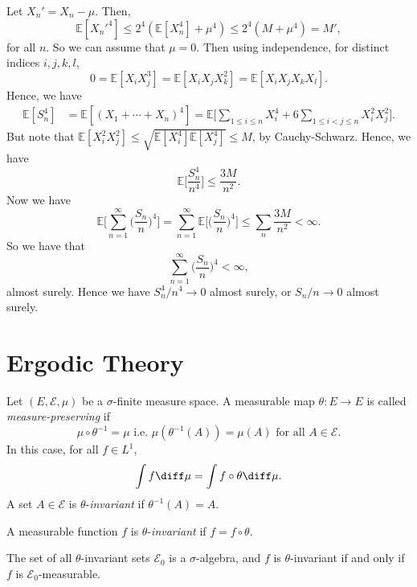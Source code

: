 \documentclass[12pt]{article}
\begin{document}
\begin{proofbox}
	Let $X_n' = X_n - \mu$. Then,
	\[
	\mathbb{E}[X_n'^4] \leq 2^4( \mathbb{E}[X_n^4] + \mu^4) \leq 2^4(M + \mu^4) = M',
	\]
	for all $n$. So we can assume that $\mu = 0$. Then using independence, for distinct indices $i, j, k, l$,
	\[
	0 = \mathbb{E}[X_i X_j^3] = \mathbb{E}[X_i X_j X_k^2] = \mathbb{E}[X_i X_j X_k X_l].
	\]
	Hence, we have
	\begin{align*}
		\mathbb{E}[S_n^4] &= \mathbb{E}[(X_1 + \cdots + X_n)^4] = \mathbb{E}\biggl[ \sum_{1 \leq i \leq n} X_i^4 + 6 \sum_{1 \leq i < j \leq n} X_i^2 X_j^2 \biggr].
	\end{align*}
	But note that $\mathbb{E}[X_i^2 X_j^2] \leq \sqrt{\mathbb{E}[X_i^4] \mathbb{E}[X_j^4]} \leq M$, by Cauchy-Schwarz. Hence, we have
	\[
	\mathbb{E}\biggl[ \frac{S_n^4}{n^4}\biggr] \leq \frac{3M}{n^2}.
	\]
	Now we have
	\[
	\mathbb{E}\biggl[ \sum_{n = 1}^{\infty} \biggl( \frac{S_n}{n} \biggr)^4 \biggr] = \sum_{n = 1}^{\infty} \mathbb{E}\biggl[ \biggl( \frac{S_n}{n} \biggr)^{4} \biggr] \leq \sum_n \frac{3M}{n^2} < \infty.
	\]
	So we have that
	\[
	\sum_{n = 1}^{\infty} \biggl( \frac{S_n}{n} \biggr)^4 < \infty,
	\]
	almost surely. Hence we have $S_n^4/n^4 \to 0$ almost surely, or $S_n/n \to 0$ almost surely.
\end{proofbox}

\newpage

\section{Ergodic Theory}
\label{sec:erg}

\begin{definition}
	Let $(E, \mathcal{E}, \mu)$ be a $\sigma$-finite measure space. A measurable map $\theta : E \to E$ is called \emph{measure-preserving} if
	\[
		\mu \circ \theta^{-1} = \mu \text{ i.e. } \mu(\theta^{-1}(A)) = \mu(A) \text{ for all } A \in \mathcal{E}.
	\]
	In this case, for all $f \in L^1$,
	\[
	\int f \diff \mu = \int f \circ \theta \diff \mu.
	\]
	A set $A \in \mathcal{E}$ is $\theta$-\emph{invariant}  if $\theta^{-1}(A) = A$.

	A measurable function $f$ is $\theta$-\emph{invariant} if $f = f \circ \theta$.

	The set of all $\theta$-invariant sets $\mathcal{E}_0$ is a $\sigma$-algebra, and $f$ is $\theta$-invariant if and only if $f$ is $\mathcal{E}_0$-measurable.
\end{definition}
\end{document}
